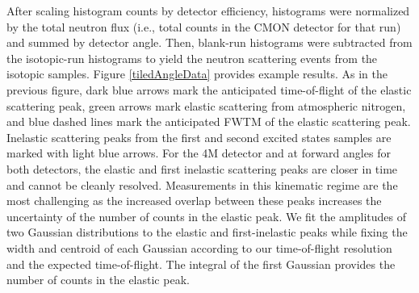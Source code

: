 After scaling histogram counts by detector efficiency, histograms were
normalized by the total neutron flux
(i.e., total counts in the CMON detector for that run) and summed by detector
angle. Then, blank-run histograms
were subtracted from the isotopic-run histograms to yield the neutron scattering
events from the isotopic samples. Figure \ref{tiledAngleData} provides example 
results. As in the previous figure, dark blue arrows mark the anticipated
time-of-flight of the elastic scattering peak, green arrows mark elastic
scattering from atmospheric nitrogen, and blue dashed lines mark the anticipated
FWTM of the elastic scattering peak. Inelastic scattering peaks from the first and
second excited states samples are marked with light blue
arrows. For the 4M detector and at forward angles for both detectors, the elastic and first 
inelastic scattering peaks are closer in time and cannot be cleanly resolved. Measurements in this
kinematic regime are the most challenging as the increased overlap between
these peaks increases the uncertainty of the number of counts in the elastic
peak. We fit the amplitudes of two Gaussian distributions to the elastic and
first-inelastic peaks while fixing
the width and centroid of each Gaussian according to our time-of-flight resolution and
the expected time-of-flight. The integral of the first Gaussian provides the
number of counts in the elastic peak.

